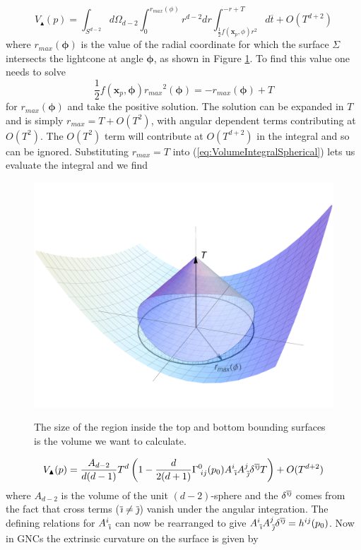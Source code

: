\documentclass[12pt]{article}
\newcommand{\be}{\begin{equation}}
\newcommand{\ee}{\end{equation}}
\newcommand{\ibar}{{\overline{\emph\i}}}
\newcommand{\jbar}{{\overline{\emph\j}}}
\begin{document}
\be\label{eq:VolumeIntegralSpherical}
V_\blacktriangle(p)=\int_{S^{d-2}}
d\Omega_{d-2}
\int_{0}^{r_{max}(\phi)}r^{d-2}dr
\int_{\frac{1}{2}f(\mathbf{x}_p,\phi)r^2}^{-r+T}
d\overline{t}+O(T^{d+2})
\ee
where $r_{max}(\boldsymbol\phi)$ is the value of the radial coordinate for which the surface $\Sigma$ intersects the lightcone at angle $\boldsymbol\phi$, as shown in Figure \ref{fig:cone_plot}. To find this value one needs to solve 
\be
\frac{1}{2}f(\mathbf{x}_p,\boldsymbol\phi){r_{max}}^2(\boldsymbol\phi)=-r_{max}(\boldsymbol\phi)+T
\ee 
for $r_{max}(\boldsymbol\phi)$ and take the positive solution. The solution can be expanded in $T$ and is simply $r_{max}=T+O(T^2)$, with angular dependent terms contributing at $O(T^2)$. The $O(T^2)$ term will contribute at $O(T^{d+2})$ in the integral and so can be ignored. Substituting $r_{max}=T$ into (\ref{eq:VolumeIntegralSpherical}) lets us evaluate the integral and we find 
\begin{figure}[t]
  \centering
    {\includegraphics[scale=0.5]{coneplot}}
     \caption{The size of the region inside the top and bottom bounding surfaces is the volume we want to calculate.}
     \label{fig:cone_plot}
\end{figure}
\be\label{eq:VolumeNoK}
V_\blacktriangle(p)
=\frac{A_{d-2}}{d(d-1)}T^d\left(1-\frac{d}{2(d+1)}\Gamma^{0}_{\;ij}(p_0)A^{i}_{\;\ibar}A^{j}_{\;\jbar}\delta^{\ibar\jbar}T\right)
+O(T^{d+2})
\ee
where $A_{d-2}$ is the volume of the unit $(d-2)$-sphere and the $\delta^{\ibar\jbar}$ comes from the fact that cross terms ($\ibar\neq \jbar$) vanish under the angular integration. The defining relations for $A^{i}_{\;\ibar}$ can now be rearranged to give $A^{i}_{\;\ibar}A^{j}_{\;\jbar}\delta^{\ibar\jbar}=h^{ij}(p_0)$. Now in GNCs the extrinsic curvature on the surface is given by
\end{document}
